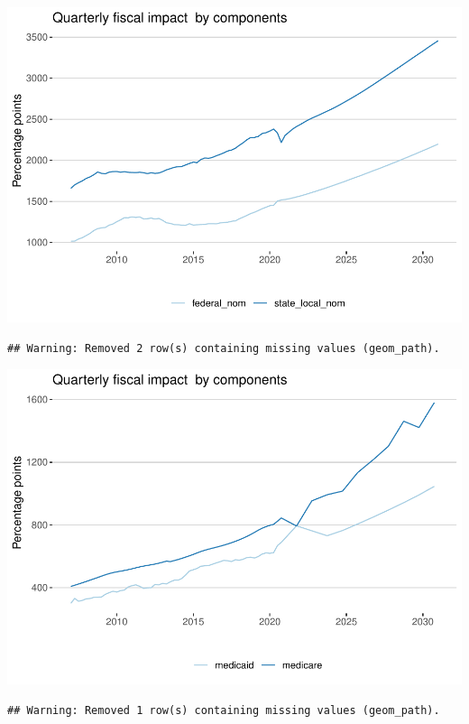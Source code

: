 \documentclass[
]{article}
\begin{document}
\begin{center}\includegraphics{projections_files/figure-latex/consumption and investment  levels-1} \end{center}

\begin{verbatim}
## Warning: Removed 2 row(s) containing missing values (geom_path).
\end{verbatim}

\begin{center}\includegraphics{projections_files/figure-latex/health levels-1} \end{center}

\begin{verbatim}
## Warning: Removed 1 row(s) containing missing values (geom_path).
\end{verbatim}
\end{document}
